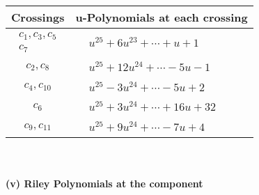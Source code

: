 \documentclass[1p]{elsarticle_modified}
\theoremstyle{definition}
\begin{document}
\begin{tabular}{m{50pt}|m{274pt}}
Crossings & \hspace{64pt}u-Polynomials at each crossing \\
\hline $$\begin{aligned}c_{1},c_{3},c_{5}\\c_{7}\end{aligned}$$&$\begin{aligned}
&u^{25}+6 u^{23}+\cdots+u+1
\end{aligned}$\\
\hline $$\begin{aligned}c_{2},c_{8}\end{aligned}$$&$\begin{aligned}
&u^{25}+12 u^{24}+\cdots-5 u-1
\end{aligned}$\\
\hline $$\begin{aligned}c_{4},c_{10}\end{aligned}$$&$\begin{aligned}
&u^{25}-3 u^{24}+\cdots-5 u+2
\end{aligned}$\\
\hline $$\begin{aligned}c_{6}\end{aligned}$$&$\begin{aligned}
&u^{25}+3 u^{24}+\cdots+16 u+32
\end{aligned}$\\
\hline $$\begin{aligned}c_{9},c_{11}\end{aligned}$$&$\begin{aligned}
&u^{25}+9 u^{24}+\cdots-7 u+4
\end{aligned}$\\
\hline
\end{tabular}\\~\\
\newpage\renewcommand{\arraystretch}{1}
\flushleft \textbf{(v) Riley Polynomials at the component}\newline \\
\end{document}
